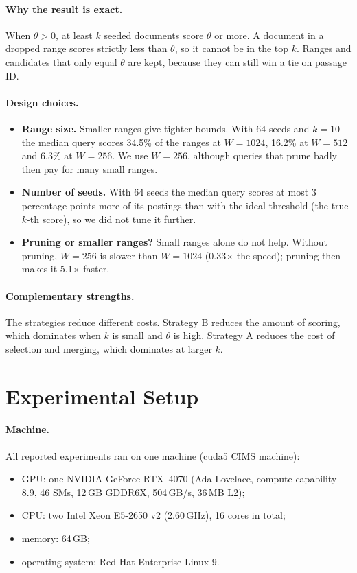\documentclass[11pt]{article}
\begin{document}
\paragraph{Why the result is exact.} When $\theta>0$, at least $k$ seeded documents score $\theta$ or more. A
document in a dropped range scores strictly less than $\theta$, so it cannot be in the top $k$. Ranges and
candidates that only equal $\theta$ are kept, because they can still win a tie on passage ID.

\paragraph{Design choices.}
\begin{itemize}
\item \textbf{Range size.} Smaller ranges give tighter bounds. With 64 seeds and $k=10$ the median query scores
  34.5\% of the ranges at $W=1024$, 16.2\% at $W=512$ and 6.3\% at $W=256$. We use $W=256$, although queries
  that prune badly then pay for many small ranges.
\item \textbf{Number of seeds.} With 64 seeds the median query scores at most 3 percentage points more of its
  postings than with the ideal threshold (the true $k$-th score), so we did not tune it further.
\item \textbf{Pruning or smaller ranges?} Small ranges alone do not help. Without pruning, $W=256$ is slower
  than $W=1024$ (0.33$\times$ the speed); pruning then makes it 5.1$\times$ faster.
\end{itemize}

\paragraph{Complementary strengths.} The strategies reduce different costs. Strategy B reduces the
amount of scoring, which dominates when $k$ is small and $\theta$ is high. Strategy A reduces the cost of
selection and merging, which dominates at larger $k$.

\section{Experimental Setup}

\paragraph{Machine.} All reported experiments ran on one machine (cuda5 CIMS machine):
\begin{itemize}
\item GPU: one NVIDIA GeForce RTX~4070 (Ada Lovelace, compute capability 8.9, 46 SMs, 12\,GB GDDR6X,
  504\,GB/s, 36\,MB L2);
\item CPU: two Intel Xeon E5-2650 v2 (2.60\,GHz), 16 cores in total;
\item memory: 64\,GB;
\item operating system: Red Hat Enterprise Linux 9.
\end{itemize}
\end{document}
